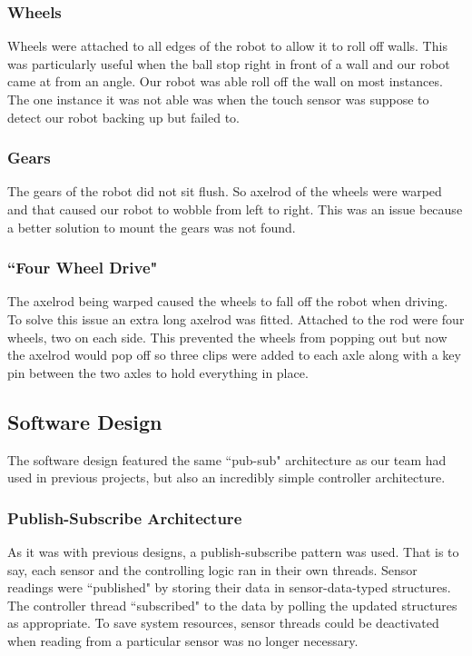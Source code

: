\documentclass{article}
\begin{document}
\subsubsection{Wheels}
Wheels were attached to all edges of the robot to allow it to roll off walls. This was particularly useful when the ball stop right in front of a wall and our robot came at from an angle. Our robot was able roll off the wall on most instances. The one instance it was not able was when the touch sensor was suppose to detect our robot backing up but failed to. 

\subsubsection{Gears}
The gears of the robot did not sit flush. So axelrod of the wheels were warped and that caused our robot to wobble from left to right. This was an issue because a better solution to mount the gears was not found. 

\subsubsection{``Four Wheel Drive"}
The axelrod being warped caused the wheels to fall off the robot when driving. To solve this issue an extra long axelrod was fitted. Attached to the rod were four wheels, two on each side. This prevented the wheels from popping out but now the axelrod would pop off so three clips were added to each axle along with a key pin between the two axles to hold everything in place. 

\subsection{Software Design}
The software design featured the same ``pub-sub" architecture as our team had used in previous projects, but also an incredibly simple controller architecture.

\subsubsection{Publish-Subscribe Architecture}
As it was with previous designs, a publish-subscribe pattern was used. That is to say, each sensor and the controlling logic ran in their own threads. Sensor readings were ``published" by storing their data in sensor-data-typed structures. The controller thread ``subscribed" to the data by polling the updated structures as appropriate. To save system resources, sensor threads could be deactivated when reading from a particular sensor was no longer necessary.
\end{document}
